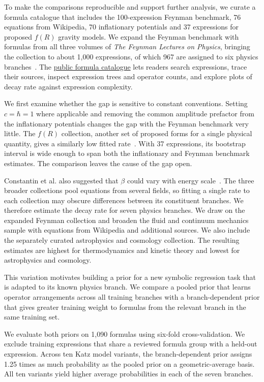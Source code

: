 \documentclass[10pt]{article}
\begin{document}
To make the comparisons reproducible and support further analysis, we curate a formula catalogue that includes the 100-expression Feynman benchmark, 76 equations from Wikipedia, 70 inflationary potentials and 37 expressions for proposed $f(R)$ gravity models. We expand the Feynman benchmark with formulas from all three volumes of \textit{The Feynman Lectures on Physics}, bringing the collection to about 1,000 expressions, of which 967 are assigned to six physics branches~\citep{udrescu2020,feynman}. The \href{https://jaysen-ma.github.io/physics-priors/data/catalog/index.html}{public formula catalogue} lets readers search expressions, trace their sources, inspect expression trees and operator counts, and explore plots of decay rate against expression complexity.

We first examine whether the gap is sensitive to constant conventions. Setting $c=\hbar=1$ where applicable and removing the common amplitude prefactor from the inflationary potentials changes the gap with the Feynman benchmark very little. The $f(R)$ collection, another set of proposed forms for a single physical quantity, gives a similarly low fitted rate~\citep{sotiriou2010}. With 37 expressions, its bootstrap interval is wide enough to span both the inflationary and Feynman benchmark estimates. The comparison leaves the cause of the gap open.

Constantin et al. also suggested that $\beta$ could vary with energy scale~\citep{constantin2026}. The three broader collections pool equations from several fields, so fitting a single rate to each collection may obscure differences between its constituent branches. We therefore estimate the decay rate for seven physics branches. We draw on the expanded Feynman collection and broaden the fluid and continuum mechanics sample with equations from Wikipedia and additional sources. We also include the separately curated astrophysics and cosmology collection. The resulting estimates are highest for thermodynamics and kinetic theory and lowest for astrophysics and cosmology.

This variation motivates building a prior for a new symbolic regression task that is adapted to its known physics branch. We compare a pooled prior that learns operator arrangements across all training branches with a branch-dependent prior that gives greater training weight to formulas from the relevant branch in the same training set.

We evaluate both priors on 1,090 formulas using six-fold cross-validation. We exclude training expressions that share a reviewed formula group with a held-out expression. Across ten Katz model variants, the branch-dependent prior assigns 1.25 times as much probability as the pooled prior on a geometric-average basis. All ten variants yield higher average probabilities in each of the seven branches.
\end{document}
